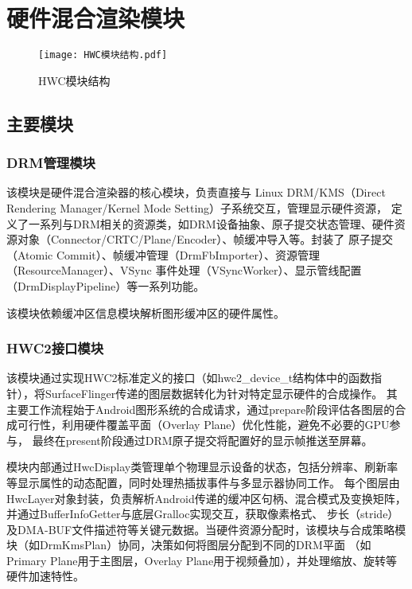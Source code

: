 \section{硬件混合渲染模块}

\begin{figure}[H]
  \centering
  \texttt{[image: HWC模块结构.pdf]}
  \caption{HWC模块结构}
  \label{fig:HWC模块结构}
\end{figure}

\subsection{主要模块}

\subsubsection{DRM管理模块}
该模块是硬件混合渲染器的核心模块，负责直接与 Linux DRM/KMS（Direct Rendering Manager/Kernel Mode Setting）子系统交互，管理显示硬件资源，
定义了一系列与DRM相关的资源类，如DRM设备抽象、原子提交状态管理、硬件资源对象（Connector/CRTC/Plane/Encoder）、帧缓冲导入等。封装了
原子提交（Atomic Commit）、帧缓冲管理（DrmFbImporter）、资源管理（ResourceManager）、VSync 事件处理（VSyncWorker）、显示管线配置（DrmDisplayPipeline）等一系列功能。

该模块依赖缓冲区信息模块解析图形缓冲区的硬件属性。

\subsubsection{HWC2接口模块}
该模块通过实现HWC2标准定义的接口（如hwc2\_device\_t结构体中的函数指针），将SurfaceFlinger传递的图层数据转化为针对特定显示硬件的合成操作。
其主要工作流程始于Android图形系统的合成请求，通过prepare阶段评估各图层的合成可行性，利用硬件覆盖平面（Overlay Plane）优化性能，避免不必要的GPU参与，
最终在present阶段通过DRM原子提交将配置好的显示帧推送至屏幕。

模块内部通过HwcDisplay类管理单个物理显示设备的状态，包括分辨率、刷新率等显示属性的动态配置，同时处理热插拔事件与多显示器协同工作。
每个图层由HwcLayer对象封装，负责解析Android传递的缓冲区句柄、混合模式及变换矩阵，并通过BufferInfoGetter与底层Gralloc实现交互，获取像素格式、
步长（stride）及DMA-BUF文件描述符等关键元数据。当硬件资源分配时，该模块与合成策略模块（如DrmKmsPlan）协同，决策如何将图层分配到不同的DRM平面
（如Primary Plane用于主图层，Overlay Plane用于视频叠加），并处理缩放、旋转等硬件加速特性。

